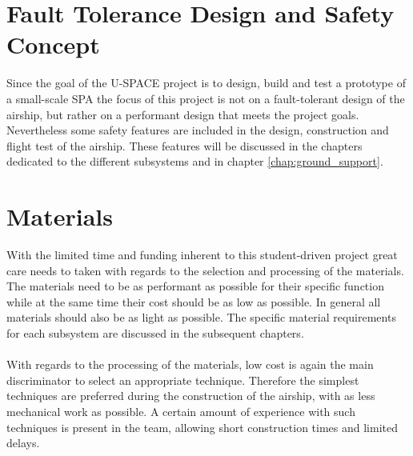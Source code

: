 \section{Fault Tolerance Design and Safety Concept}

Since the goal of the \ac{U-SPACE} project is to design, build and test a prototype of a small-scale \ac{SPA} the focus of this project is not on a fault-tolerant design of the airship, but rather on a performant design that meets the project goals. Nevertheless some safety features are included in the design, construction and flight test of the airship. These features will be discussed in the chapters dedicated to the different subsystems and in chapter \ref{chap:ground_support}.

\section{Materials}

With the limited time and funding inherent to this student-driven project great care needs to taken with regards to the selection and processing of the materials. The materials need to be as performant as possible for their specific function while at the same time their cost should be as low as possible. In general all materials should also be as light as possible. The specific material requirements for each subsystem are discussed in the subsequent chapters.
\\
\\
With regards to the processing of the materials, low cost is again the main discriminator to select an appropriate technique. Therefore the simplest techniques are preferred during the construction of the airship, with as less mechanical work as possible. A certain amount of experience with such techniques is present in the team, allowing short construction times and limited delays.